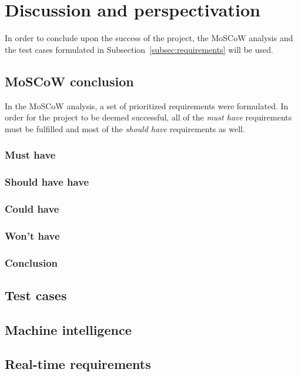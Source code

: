 \section{Discussion and perspectivation}
In order to conclude upon the success of the project, the MoSCoW analysis and the test cases formulated in Subsection~\ref{subsec:requirements} will be used.

\subsection{MoSCoW conclusion}
In the MoSCoW analysis, a set of prioritized requirements were formulated.
In order for the project to be deemed successful, all of the \textit{must have} requirements must be fulfilled and most of the \textit{should have} requirements as well.

\subsubsection{Must have}
\subsubsection{Should have have}
\subsubsection{Could have}
\subsubsection{Won't have}
\subsubsection{Conclusion}


\subsection{Test cases}



\subsection{Machine intelligence}

\subsection{Real-time requirements}

